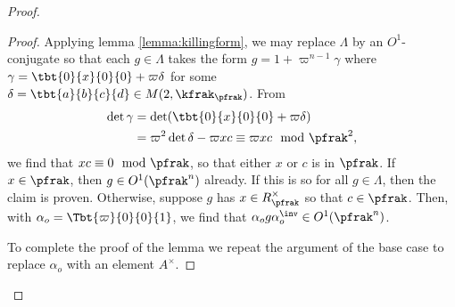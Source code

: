 \begin{proof}
\begin{proof}
    Applying lemma \ref{lemma:killingform}, we may replace $\Lambda$ by an $O^1$-conjugate so that each $g \in \Lambda$ takes the form $g = 1 + \varpi^{n-1}\gamma$ where $\gamma = \tbt{0}{x}{0}{0} +\varpi\delta$ for some $\delta =\tbt{a}{b}{c}{d} \in M(2,\kfrak_\pfrak)$. From
    \begin{align*}
      \det \gamma & = \det (\tbt{0}{x}{0}{0} +\varpi\delta)                              \\
                  & = \varpi^2 \det \delta - \varpi x c  \equiv \varpi xc \mod \pfrak^2,
    \end{align*}
    we find that $xc \equiv 0 \mod \pfrak$, so that either $x$ or $c$ is in $\pfrak$. If $x\in \pfrak$, then $g \in O^1(\pfrak^n)$ already. If this is so for all $g \in \Lambda$, then the claim is proven. Otherwise, suppose $g$ has $x \in R_\pfrak^\times$ so that $c \in \pfrak$. Then, with $\alpha_o = \Tbt{\varpi}{0}{0}{1}$, we find that $\alpha_o g \alpha_o^\inv \in O^1(\pfrak^n)$.

    To complete the proof of the lemma we repeat the argument of the base case to replace $\alpha_o$ with an element $A^\times$.
  \end{proof}




\end{proof}
